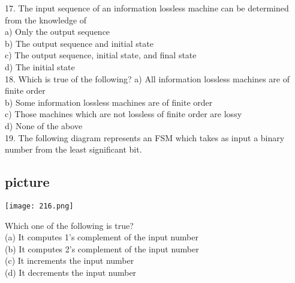 \documentclass[8pt]{beamer}
\begin{document}
\begin{frame}
\begin{multicols}{2}

17. The input sequence of an information lossless
machine can be determined from the
knowledge of\\
\hspace*{0.4cm} a) Only the output sequence\\
\hspace*{0.4cm} b) The output sequence and initial state\\
\hspace*{0.4cm} c) The output sequence, initial state, and
final state\\
\hspace*{0.4cm} d) The initial state\\

\vspace*{0.3cm}
18. Which is true of the following?
\hspace*{0.4cm} a) All information lossless machines are
of finite order\\
\hspace*{0.4cm} b) Some information lossless machines
are of finite order\\
\hspace*{0.4cm} c) Those machines which are not lossless
of finite order are lossy\\
\hspace*{0.4cm} d) None of the above\\

\vspace*{0.3cm}
19. The following diagram represents an FSM
which takes as input a binary number from
the least significant bit.\\
\begin{center}
\section{picture}
\texttt{[image: 216.png]}
\end{center}
\hspace*{0.4cm} Which one of the following is true?\\
\hspace*{0.4cm} (a) It computes 1's complement of the
input number\\
\hspace*{0.4cm} (b) It computes 2's complement of the
input number\\
\hspace*{0.4cm} (c) It increments the input number\\
\hspace*{0.4cm} (d) It decrements the input number\\
\end{multicols}
\end{frame}
\end{document}
